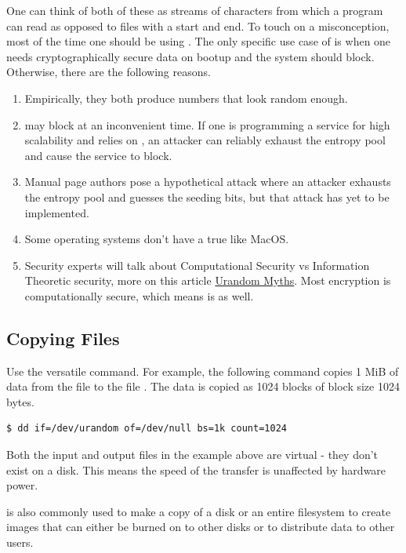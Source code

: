 One can think of both of these as streams of characters from which a program can read as opposed to files with a start and end.
To touch on a misconception, most of the time one should be using .
The only specific use case of  is when one needs cryptographically secure data on bootup and the system should block.
Otherwise, there are the following reasons.

\begin{enumerate}
\item Empirically, they both produce numbers that look random enough.
\item {} may block at an inconvenient time. If one is programming a service for high scalability and relies on , an attacker can reliably exhaust the entropy pool and cause the service to block.
\item Manual page authors pose a hypothetical attack where an attacker exhausts the entropy pool and guesses the seeding bits, but that attack has yet to be implemented.
\item Some operating systems don't have a true  like MacOS.
\item Security experts will talk about Computational Security vs Information Theoretic security, more on this article \href{https://www.2uo.de/myths-about-urandom}{Urandom Myths}. Most encryption is computationally secure, which means  is as well.
\end{enumerate}

\subsection{Copying Files}

Use the versatile  command.
For example, the following command copies 1 MiB of data from the file  to the file .
The data is copied as 1024 blocks of block size 1024 bytes.

\begin{lstlisting}[language=bash]
$ dd if=/dev/urandom of=/dev/null bs=1k count=1024
\end{lstlisting}

Both the input and output files in the example above are virtual - they don't exist on a disk.
This means the speed of the transfer is unaffected by hardware power.

 is also commonly used to make a copy of a disk or an entire filesystem to create images that can either be burned on to other disks or to distribute data to other users.

